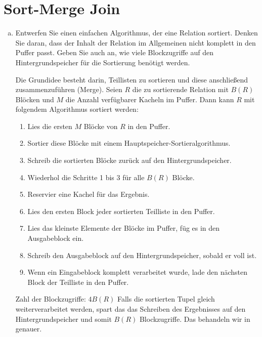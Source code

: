 \section{Sort-Merge Join}
\label{sec:sort_merge}

\begin{enumerate}[a)]

\item \label{item:sortierung} Entwerfen Sie einen einfachen Algorithmus, der eine Relation sortiert.
	Denken Sie daran, dass der Inhalt der Relation im Allgemeinen nicht komplett in den Puffer passt.
	Geben Sie auch an, wie viele Blockzugriffe auf den Hintergrundspeicher für die Sortierung benötigt werden.

	\begin{solution}
		Die Grundidee besteht darin, Teillisten zu sortieren und diese anschließend zusammenzuführen (Merge).
		Seien \(R\) die zu sortierende Relation mit \(B(R)\) Blöcken und \(M\) die Anzahl verfügbarer Kacheln im Puffer.
		Dann kann \(R\) mit folgendem Algorithmus sortiert werden:

		\begin{enumerate}[1.]
		\item Lies die ersten \(M\) Blöcke von \(R\) in den Puffer.
		\item Sortier diese Blöcke mit einem Hauptspeicher-Sortieralgorithmus.
		\item Schreib die sortierten Blöcke zurück auf den Hintergrundspeicher.
		\item Wiederhol die Schritte 1 bis 3 für alle \(B(R)\) Blöcke.
		\item Reservier eine Kachel für das Ergebnis.
		\item Lies den ersten Block jeder sortierten Teilliste in den Puffer.
		\item Lies das kleinste Elemente der Blöcke im Puffer, füg es in den Ausgabeblock ein.
		\item Schreib den Ausgabeblock auf den Hintergrundspeicher, sobald er voll ist.
		\item Wenn ein Eingabeblock komplett verarbeitet wurde, lade den nächsten Block der Teilliste in den Puffer.
		\end{enumerate}

		Zahl der Blockzugriffe: \(4 B(R)\)
		Falls die sortierten Tupel gleich weiterverarbeitet werden, spart das das Schreiben des Ergebnisses auf den Hintergrundspeicher und somit \(B(R)\) Blockzugriffe.
		Das behandeln wir in \PipeliningKosten genauer.


\end{solution}
\end{enumerate}
